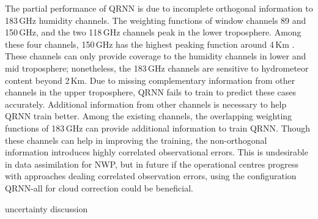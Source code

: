 \documentclass[amt, manuscript]{copernicus}
\newcommand{\todo}[1]{{\color{red} #1}}
\begin{document}
The partial performance of QRNN is due to incomplete orthogonal information to 183\,GHz humidity channels.  The weighting functions of window channels 89 and 150\,GHz, and the two 118\,GHz channels peak in the lower troposphere. Among these four channels, 150\,GHz has the highest peaking function around 4\,Km \cite{chen2020mwhs}. These channels can only provide coverage to the humidity channels in lower and mid troposphere; nonetheless, the 183\,GHz channels are sensitive to hydrometeor content beyond 2\,Km. Due to missing complementary information from other channels in the upper troposphere, QRNN fails to train to predict these cases accurately. Additional information from other channels is necessary to help QRNN train better. Among the existing channels, the overlapping weighting functions of 183\,GHz can provide additional information to train QRNN. Though these channels can help in improving the training, the non-orthogonal information introduces highly correlated observational errors. This is undesirable in data assimilation for NWP, but in future if the operational centres progress with approaches dealing correlated observation errors, using the configuration QRNN-all for cloud correction could be beneficial.

\todo{ uncertainty discussion}
\end{document}
